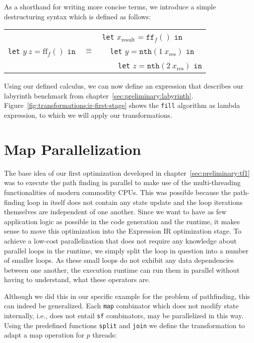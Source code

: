 As a shorthand for writing more concise terms, we introduce a simple destructuring syntax which is defined as follows:
\begin{center}
    \begin{tabular}{l c l}
        && \texttt{let} $x_{\text{result}} = \texttt{ff}_f() \texttt{ in}$\\
        \texttt{let} $y\ z = \text{ff}_f() \texttt{ in}$ & $\equiv$ & \ \ \texttt{let} $y = \texttt{nth}(1\ x_{\text{res}}) \texttt{ in}$\\
        && \ \ \ \ \texttt{let} $z = \texttt{nth}(2\ x_{\text{res}}) \texttt{ in}$\\
    \end{tabular}
\end{center}

Using our defined calculus, we can now define an expression that describes our labyrinth benchmark from chapter~\ref{sec:preliminary:labyrinth}.
Figure~\ref{fig:transformations:ir-first-stage} shows the \texttt{fill} algorithm as lambda expression, to which we will apply our transformations.

\section{Map Parallelization}%
\label{sec:transformations:tf1}

The base idea of our first optimization developed in chapter~\ref{sec:preliminary:tf1} was to execute the path finding in parallel to make use of the multi-threading functionalities of modern commodity CPUs.
This was possible because the path-finding loop in itself does not contain any state update and the loop iterations themselves are independent of one another.
Since we want to have as few application logic as possible in the code generation and the runtime, it makes sense to move this optimization into the Expression IR optimization stage.
To achieve a low-cost parallelization that does not require any knowledge about parallel loops in the runtime, we simply split the loop in question into a number of smaller loops.
As these small loops do not exhibit any data dependencies between one another, the execution runtime can run them in parallel without having to understand, what these operators are.

Although we did this in our specific example for the problem of pathfinding, this can indeed be generalized.
Each \texttt{map} combinator which does not modify state internally, i.e., does not entail \texttt{sf} combinators, may be parallelized in this way.
Using the predefined functions \texttt{split} and \texttt{join} we define the transformation to adapt a map operation for $p$ threads:

